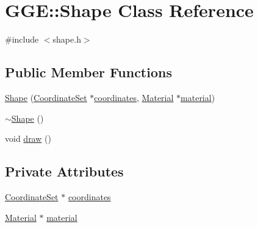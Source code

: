 \hypertarget{class_g_g_e_1_1_shape}{\section{G\+G\+E\+:\+:Shape Class Reference}
\label{class_g_g_e_1_1_shape}
}


{\ttfamily \#include $<$shape.\+h$>$}

\subsection*{Public Member Functions}
\begin{DoxyCompactItemize}
\item 
\hyperlink{class_g_g_e_1_1_shape_a568515deeb0f832c3ad8e2be20eaa6a3}{Shape} (\hyperlink{struct_g_g_e_1_1_coordinate_set}{Coordinate\+Set} $\ast$\hyperlink{class_g_g_e_1_1_shape_ad6392d5b844dc53fb1ecdf243cdc5768}{coordinates}, \hyperlink{class_g_g_e_1_1_material}{Material} $\ast$\hyperlink{class_g_g_e_1_1_shape_ace878a519d26bf5d2f6ea9069d848005}{material})
\item 
\hyperlink{class_g_g_e_1_1_shape_a7b2ba77135ea6137aa5389bad8491c23}{$\sim$\+Shape} ()
\item 
void \hyperlink{class_g_g_e_1_1_shape_ad13eced749894c65fb07348b25c67250}{draw} ()
\end{DoxyCompactItemize}
\subsection*{Private Attributes}
\begin{DoxyCompactItemize}
\item 
\hyperlink{struct_g_g_e_1_1_coordinate_set}{Coordinate\+Set} $\ast$ \hyperlink{class_g_g_e_1_1_shape_ad6392d5b844dc53fb1ecdf243cdc5768}{coordinates}
\item 
\hyperlink{class_g_g_e_1_1_material}{Material} $\ast$ \hyperlink{class_g_g_e_1_1_shape_ace878a519d26bf5d2f6ea9069d848005}{material}
\end{DoxyCompactItemize}


